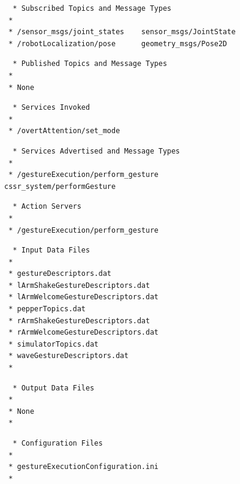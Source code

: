 \documentclass{CSSRforAfrica}
\newcommand{\checkboxChecked}{\fbox{\ding{51}}} %
\begin{document}
\begin{description}
\item[\checkboxChecked] 
 {\small 
\begin{verbatim}
  * Subscribed Topics and Message Types
 *
 * /sensor_msgs/joint_states    sensor_msgs/JointState
 * /robotLocalization/pose      geometry_msgs/Pose2D
\end{verbatim}}

\item[\checkboxChecked] 
 {\small 
\begin{verbatim}                    
  * Published Topics and Message Types
 *
 * None
\end{verbatim}}

\item[\checkboxChecked] 
 {\small 
\begin{verbatim}                    
  * Services Invoked
 * 
 * /overtAttention/set_mode
\end{verbatim}}

\item[\checkboxChecked] 
 {\small 
\begin{verbatim}                    
  * Services Advertised and Message Types
 *
 * /gestureExecution/perform_gesture    cssr_system/performGesture
\end{verbatim}}

\item[\checkboxChecked] 
 {\small 
\begin{verbatim}                    
  * Action Servers
 *
 * /gestureExecution/perform_gesture
\end{verbatim}}

\item[\checkboxChecked] 
 {\small 
\begin{verbatim}
  * Input Data Files
 *
 * gestureDescriptors.dat 
 * lArmShakeGestureDescriptors.dat 
 * lArmWelcomeGestureDescriptors.dat 
 * pepperTopics.dat 
 * rArmShakeGestureDescriptors.dat 
 * rArmWelcomeGestureDescriptors.dat 
 * simulatorTopics.dat 
 * waveGestureDescriptors.dat
 *
\end{verbatim}}

\item[\checkboxChecked] 
 {\small 
\begin{verbatim}
  * Output Data Files
 *
 * None
 *
\end{verbatim}}

\item[\checkboxChecked] 
 {\small 
\begin{verbatim}
  * Configuration Files
 *
 * gestureExecutionConfiguration.ini
 *
\end{verbatim}}


\end{description}
\end{document}
